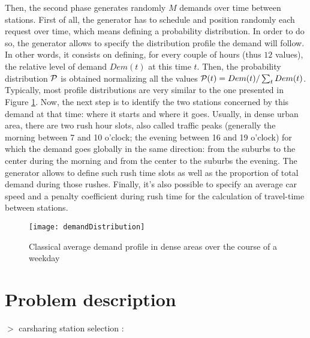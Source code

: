 \begin{bibunit}[ieeetr]
Then, the second phase generates randomly $M$ demands over time between stations. First of all, the generator has to schedule and position randomly each request over time, which means defining a probability distribution. In order to do so, the generator allows to specify the distribution profile the demand will follow. In other words, it consists on defining, for every couple of hours (thus $12$ values), the relative level of demand $Dem(t)$ at this time $t$. Then, the probability distribution $\cal {P}$ is obtained normalizing all the values \ie ${\cal {P}}(t) = Dem(t) \slash \sum_{t}{Dem(t)}$. Typically, most profile distributions are very similar to the one presented in Figure \ref{fig:demandProfile}.
Now, the next step is to identify the two stations concerned by this demand at that time: where it starts and where it goes. Usually, in dense urban area, there are two rush hour slots, also called traffic peaks (generally the morning between 7 and 10 o'clock; the evening between 16 and 19 o'clock) for which the demand goes globally in the same direction: from the suburbs to the center during the morning and from the center to the suburbs the evening. The generator allows to define such rush time slots as well as the proportion of total demand during those rushes. Finally, it's also possible to specify an average car speed and a penalty coefficient during rush time for the calculation of travel-time between stations.

\begin{figure}[t]
\flushleft
\texttt{[image: demandDistribution]}
\caption{Classical average demand profile in dense areas over the course of a weekday}
\label{fig:demandProfile}
\end{figure}

\newpage
\section{Problem description}
$>$ carsharing station selection : \cite{ion_site_2009}

\newpage
{}
\renewcommand{\bibname}{Bibliography of chapter \thechapter}
\end{bibunit}

